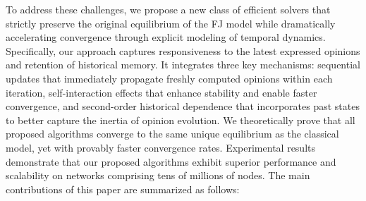 To address these challenges, we propose a new class of efficient solvers that strictly preserve the original equilibrium of the FJ model while dramatically accelerating convergence through explicit modeling of temporal dynamics. Specifically, our approach captures responsiveness to the latest expressed opinions and retention of historical memory. It integrates three key mechanisms: sequential updates that immediately propagate freshly computed opinions within each iteration, self-interaction effects that enhance stability and enable faster convergence, and second-order historical dependence that incorporates past states to better capture the inertia of opinion evolution. We theoretically prove that all proposed algorithms converge to the same unique equilibrium as the classical model, yet with provably faster convergence rates. Experimental results demonstrate that our proposed algorithms exhibit superior performance and scalability on networks comprising tens of millions of nodes. The main contributions of this paper are summarized as follows:

